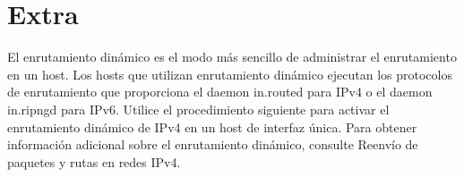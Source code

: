 \documentclass[a4paper, 11pt, oneside]{article}
\begin{document}
\section*{Extra}
El enrutamiento dinámico es el modo más sencillo de administrar el enrutamiento en un host. Los hosts que utilizan enrutamiento dinámico ejecutan los protocolos de enrutamiento que proporciona el daemon in.routed para IPv4 o el daemon in.ripngd para IPv6. Utilice el procedimiento siguiente para activar el enrutamiento dinámico de IPv4 en un host de interfaz única. Para obtener información adicional sobre el enrutamiento dinámico, consulte Reenvío de paquetes y rutas en redes IPv4.
\end{document}
